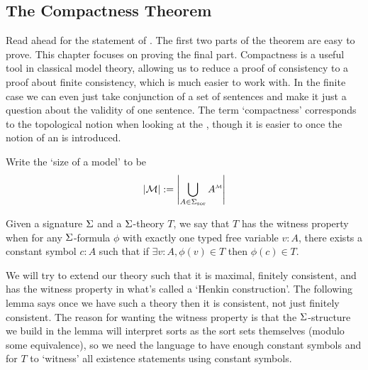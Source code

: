 \subsection{The Compactness Theorem}

Read ahead for the statement of .
The first two parts of the theorem are easy to prove.
This chapter focuses on proving the final part.
Compactness is a useful tool in classical model theory,
allowing us to reduce a proof of consistency to a 
proof about finite consistency,
which is much easier to work with.
In the finite case we can even just take conjunction of a set of 
sentences and make it just a question about the validity of one sentence.
The term `compactness' corresponds to the topological notion when 
looking at the ,
though it is easier to 
 once the notion of an 
 is introduced.

\begin{nttn}
    Write the `size of a model' to be 
    \[
        \abs{\MM} := \abs{\bigcup_{A \in \sort{\Si}} \mmintp{A}}
    \]
\end{nttn}

\begin{dfn}
    Given a signature $\Sigma$ and a $\Sigma$-theory $T$, 
    we say that $T$ has the witness property when
    for any $\Sigma$-formula $\phi$ with 
    exactly one typed free variable $v : A$,
    there exists a constant symbol $c : A$ such that if
    $\exists v : A, \phi(v) \in T$ then $\phi(c) \in T$.
\end{dfn}
We will try to extend our theory such that it is maximal,
finitely consistent, and has the witness property
in what's called a `Henkin construction'.
The following lemma says once we have such a theory then 
it is consistent, not just finitely consistent.
The reason for wanting the witness property is that 
the $\Sigma$-structure we build in the lemma will interpret sorts as the 
sort sets themselves (modulo some equivalence), 
so we need the language to have enough constant symbols and
for $T$ to `witness' all existence statements using constant symbols.

